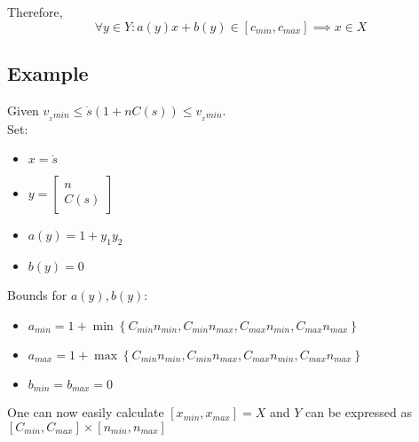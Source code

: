 Therefore,
\begin{equation}
	\forall y \in Y: a(y) x + b(y) \in [c_{min}, c_{max}] \implies x \in X
\end{equation}

\subsection{Example}

Given $v_{_xmin}\leq \dot{s}(1 + nC(s)) \leq v_{_xmin}$.
\\
Set:
\begin{itemize}
	\item $x = \dot{s}$
	\item $y = \begin{bmatrix} n \\ C(s) \end{bmatrix}$
	\item $a(y) = 1 + y_1 y_2$
	\item $b(y) = 0$
\end{itemize}
Bounds for $a(y), b(y)$:
\begin{itemize}
	\item $a_{min} = 1 + \min \left\{ C_{min}n_{min}, C_{min}n_{max}, C_{max}n_{min}, C_{max}n_{max} \right\}$
	\item $a_{max} = 1 + \max \left\{ C_{min}n_{min}, C_{min}n_{max}, C_{max}n_{min}, C_{max}n_{max} \right\}$
	\item $b_{min} = b_{max} = 0$
\end{itemize}
One can now easily calculate $[x_{min}, x_{max}] = X$ and $Y$ can be expressed as $[C_{min}, C_{max}] \times [n_{min}, n_{max}]$